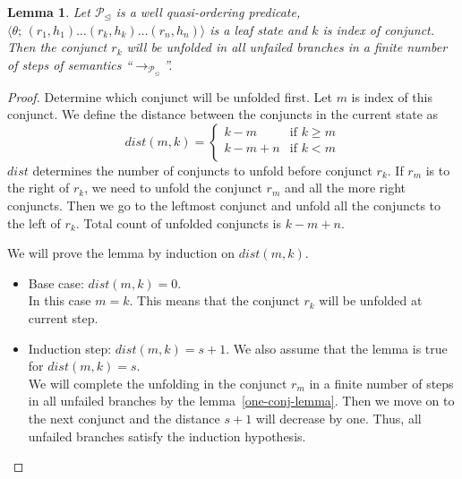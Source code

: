 \documentclass{article}[12pt]
\newcommand{\inbr}[1]{\langle #1 \rangle}
\newtheorem{lemma}[theorem]{Lemma}
\begin{document}
\begin{lemma}
Let $\mathcal{P}_\trianglelefteq$ is a well quasi-ordering predicate, $\inbr{\theta;\, (r_1,h_1)\ldots(r_k,h_k)\ldots(r_n,h_n)}$ is a leaf state and $k$ is index of conjunct. Then the conjunct $r_k$ will be unfolded in all unfailed branches in a finite number of steps of semantics ``$\rightarrow_{\mathcal{P}_\trianglelefteq}$''.
\end{lemma}
\begin{proof}
Determine which conjunct will be unfolded first. Let $m$ is index of this conjunct. We define the distance between the conjuncts in the current state as
\[
dist(m, k) =
\left\{
\begin{array}{ll}
 k - m     & \mbox{if } k \geq m \\
 k - m + n & \mbox{if } k < m \\
\end{array}
\right.
\]
$dist$ determines the number of conjuncts to unfold before conjunct $r_k$. If $r_m$ is to the right of $r_k$, we need to unfold the conjunct $r_m$ and all the more right conjuncts. Then we go to the leftmost conjunct and unfold all the conjuncts to the left of $r_k$. Total count of unfolded conjuncts is $k - m + n$.

We will prove the lemma by induction on $dist(m, k)$.
\begin{itemize}
    \item Base case: $dist(m, k) = 0$. \\
    In this case $m = k$. This means that the conjunct $r_k$ will be unfolded at current step.
    \item Induction step: $dist(m, k) = s + 1$. We also assume that the lemma is true for $dist(m, k) = s$.\\
    We will complete the unfolding in the conjunct $r_m$ in a finite number of steps in all unfailed branches by the lemma~\ref{one-conj-lemma}. Then we move on to the next conjunct and the distance $s + 1$ will decrease by one. Thus, all unfailed branches satisfy the induction hypothesis.

\end{itemize}
\end{proof}
\end{document}
